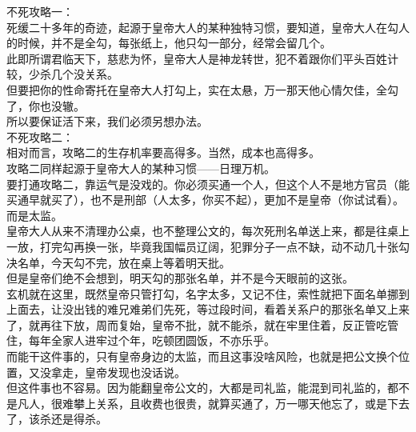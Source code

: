 \begin{multicols}{\theparacolNo}
不死攻略一：\\

死缓二十多年的奇迹，起源于皇帝大人的某种独特习惯，要知道，皇帝大人在勾人的时候，并不是全勾，每张纸上，他只勾一部分，经常会留几个。\\

此即所谓君临天下，慈悲为怀，皇帝大人是神龙转世，犯不着跟你们平头百姓计较，少杀几个没关系。\\

但要把你的性命寄托在皇帝大人打勾上，实在太悬，万一那天他心情欠佳，全勾了，你也没辙。\\

所以要保证活下来，我们必须另想办法。\\

不死攻略二：\\

相对而言，攻略二的生存机率要高得多。当然，成本也高得多。\\

攻略二同样起源于皇帝大人的某种习惯——日理万机。\\

要打通攻略二，靠运气是没戏的。你必须买通一个人，但这个人不是地方官员（能买通早就买了），也不是刑部（人太多，你买不起），更加不是皇帝（你试试看）。\\

而是太监。\\

皇帝大人从来不清理办公桌，也不整理公文的，每次死刑名单送上来，都是往桌上一放，打完勾再换一张，毕竟我国幅员辽阔，犯罪分子一点不缺，动不动几十张勾决名单，今天勾不完，放在桌上等着明天批。\\

但是皇帝们绝不会想到，明天勾的那张名单，并不是今天眼前的这张。\\

玄机就在这里，既然皇帝只管打勾，名字太多，又记不住，索性就把下面名单挪到上面去，让没出钱的难兄难弟们先死，等过段时间，看着关系户的那张名单又上来了，就再往下放，周而复始，皇帝不批，就不能杀，就在牢里住着，反正管吃管住，每年全家人进牢过个年，吃顿团圆饭，不亦乐乎。\\

而能干这件事的，只有皇帝身边的太监，而且这事没啥风险，也就是把公文换个位置，又没拿走，皇帝发现也没话说。\\

但这件事也不容易。因为能翻皇帝公文的，大都是司礼监，能混到司礼监的，都不是凡人，很难攀上关系，且收费也很贵，就算买通了，万一哪天他忘了，或是下去了，该杀还是得杀。\\


\end{multicols}
